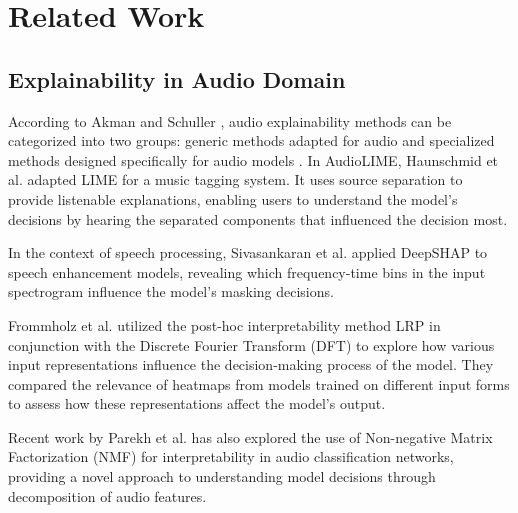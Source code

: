\documentclass[../report.tex]{subfiles}
\begin{document}
    \section{Related Work}
    \label{sec:related_work}


    \subsection{Explainability in Audio Domain}
    According to Akman and Schuller \cite{doi:10.34133/icomputing.0074}, audio explainability methods can be categorized into two groups: generic methods adapted for audio \cite{bach2015pixel,Selvaraju_2019,lundberg2017unified} and specialized methods designed specifically for audio models \cite{10094635,10143311,10447390,haunschmid2020audiolime}. In AudioLIME, Haunschmid et al. \cite{haunschmid2020audiolime} adapted LIME \cite{ribeiro2016should} for a music tagging system. It uses source separation to provide listenable explanations, enabling users to understand the model's decisions by hearing the separated components that influenced the decision most. 

    In the context of speech processing, Sivasankaran et al. \cite{sivasankaran2021explaining} applied DeepSHAP to speech enhancement models, revealing which frequency-time bins in the input spectrogram influence the model's masking decisions.

    Frommholz et al. \cite{10.1145/3617233.3617265} utilized the post-hoc interpretability method LRP in conjunction with the Discrete Fourier Transform (DFT) to explore how various input representations influence the decision-making process of the model. They compared the relevance of heatmaps from models trained on different input forms to assess how these representations affect the model's output.

    Recent work by Parekh et al. \cite{10413597} has also explored the use of Non-negative Matrix Factorization (NMF) for interpretability in audio classification networks, providing a novel approach to understanding model decisions through decomposition of audio features.
\end{document}
